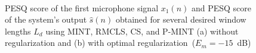 \documentclass[draftcls,onecolumn,11pt]{IEEEtran}
\begin{document}
\begin{figure}[h]
\centering
\hbox{\hspace{-1.1cm}
}
\caption{PESQ score of the first microphone signal $x_1(n)$ and PESQ score of the system's output $\hat{s}(n)$ obtained for several desired window lengths $L_d$ using MINT, RMCLS, CS, and P-MINT (a) without regularization and (b) with optimal regularization~($E_m = -15$~dB)}
\end{figure}
\end{document}
